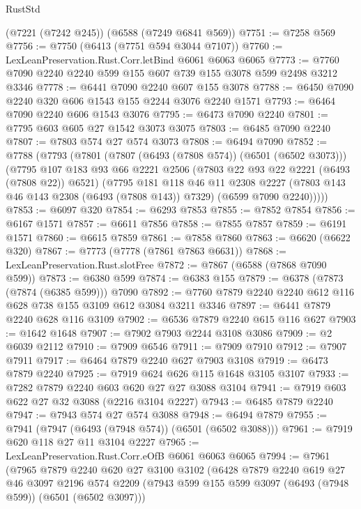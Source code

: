 \begin{lexlean}{RustStd}
\begin{coremodule}
    (@7221 (@7242 @245))
    (@6588 (@7249 @6841 @569))
@7751 := @7258 @569
@7756 := @7750 (@6413 (@7751 @594 @3044 @7107))
@7760 := LexLeanPreservation.Rust.Corr.letBind @6061 @6063 @6065
@7773 := @7760 @7090 @2240 @2240 @599 @155 @607 @739 @155 @3078 @599 @2498 @3212 @3346
@7778 := @6441 @7090 @2240 @607 @155 @3078
@7788 := @6450 @7090 @2240 @320 @606 @1543 @155 @2244 @3076 @2240 @1571
@7793 := @6464 @7090 @2240 @606 @1543 @3076
@7795 := @6473 @7090 @2240
@7801 := @7795 @603 @605 @27 @1542 @3073 @3075
@7803 := @6485 @7090 @2240
@7807 := @7803 @574 @27 @574 @3073
@7808 := @6494 @7090
@7852 := @7788
    (@7793
      (@7801
        (@7807 (@6493 (@7808 @574)) (@6501 (@6502 @3073)))
        (@7795
          @107
          @183
          @93
          @66
          @2221
          @2506
          (@7803 @22 @93 @22 @2221 (@6493 (@7808 @22)) @6521)
          (@7795
            @181
            @118
            @46
            @11
            @2308
            @2227
            (@7803 @143 @46 @143 @2308 (@6493 (@7808 @143)) @7329)
            (@6599 @7090 @2240)))))
@7853 := @6097 @320
@7854 := @6293 @7853
@7855 := @7852 @7854
@7856 := @6167 @1571
@7857 := @6611 @7856
@7858 := @7855 @7857
@7859 := @6191 @1571
@7860 := @6615 @7859
@7861 := @7858 @7860
@7863 := @6620 (@6622 @320)
@7867 := @7773 (@7778 (@7861 @7863 @6631))
@7868 := LexLeanPreservation.Rust.slotFree
@7872 := @7867 (@6588 (@7868 @7090 @599))
@7873 := @6380 @599
@7874 := @6383 @155
@7879 := @6378 (@7873 (@7874 (@6385 @599))) @7090
@7892 := @7760 @7879 @2240 @2240 @612 @116 @628 @738 @155 @3109 @612 @3084 @3211 @3346
@7897 := @6441 @7879 @2240 @628 @116 @3109
@7902 := @6536 @7879 @2240 @615 @116 @627
@7903 := @1642 @1648
@7907 := @7902 @7903 @2244 @3108 @3086
@7909 := @2 @6039 @2112
@7910 := @7909 @6546
@7911 := @7909 @7910
@7912 := @7907 @7911
@7917 := @6464 @7879 @2240 @627 @7903 @3108
@7919 := @6473 @7879 @2240
@7925 := @7919 @624 @626 @115 @1648 @3105 @3107
@7933 := @7282 @7879 @2240 @603 @620 @27 @27 @3088 @3104
@7941 := @7919 @603 @622 @27 @32 @3088 (@2216 @3104 @2227)
@7943 := @6485 @7879 @2240
@7947 := @7943 @574 @27 @574 @3088
@7948 := @6494 @7879
@7955 := @7941 (@7947 (@6493 (@7948 @574)) (@6501 (@6502 @3088)))
@7961 := @7919 @620 @118 @27 @11 @3104 @2227
@7965 := LexLeanPreservation.Rust.Corr.eOfB @6061 @6063 @6065
@7994 := @7961
    (@7965
      @7879
      @2240
      @620
      @27
      @3100
      @3102
      (@6428
        @7879
        @2240
        @619
        @27
        @46
        @3097
        @2196
        @574
        @2209
        (@7943 @599 @155 @599 @3097 (@6493 (@7948 @599)) (@6501 (@6502 @3097)))

\end{coremodule}
\end{lexlean}
